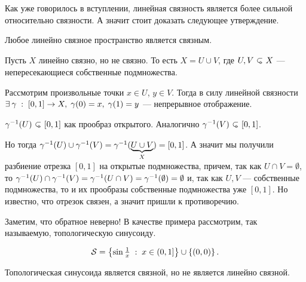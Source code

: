 Как уже говорилось в вступлении, линейная связность является более сильной относительно связности. А значит стоит доказать следующее утверждение.
\begin{Prop}
    Любое линейно связное пространство является связным.
\end{Prop}
\begin{Proof}
    Пусть  $X$ линейно связно, но не связно. То есть $X = U \cup V$, где $U,V \open X$ --- непересекающиеся собственные подмножества. 

    Рассмотрим произвольные точки $x\in U$, $y \in V$. Тогда в силу линейной связности $\exists \gamma \st [0,1] \to X, \; \gamma(0) = x,\; \gamma(1) = y$ --- непрерывное отображение. 

    $\inv{\gamma}(U) \open [0,1]$ как прообраз открытого. Аналогично $\inv{\gamma}(V) \open [0,1]$. 

    Но тогда $\gamma^{-1}(U) \cup \gamma^{-1}(V) = \gamma^{-1}(\underbrace{U\cup V}_X) = [0,1]$. А значит мы получили разбиение отрезка $[0,1]$ на открытые подмножества, причем, так как  $U\cap V = \emptyset$, то $\gamma^{-1}(U) \cap \gamma^{-1}(V) = \gamma^{-1} (U \cap V) = \gamma^{-1}(\emptyset) = \emptyset$ и, так как $U, V$ --- собственные подмножества, то и их прообразы собственные подмножества уже $[0,1]$. Но известно, что отрезок связен, а значит пришли к противоречию.
\end{Proof}
\begin{Note}
    Заметим, что обратное неверно! В качестве примера рассмотрим, так называемую, топологическую синусоиду.

    \[
        \mathcal{S} = \left\{ \sin \tfrac1x \; : \; x \in (0, 1]  \right\} \cup \left\{ (0,0) \right\}.
    \] 
\end{Note}
\begin{Prop}
    Топологическая синусоида является связной, но не является линейно связной.
\end{Prop}

